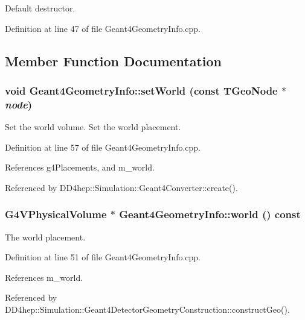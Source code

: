 Default destructor. 

Definition at line 47 of file Geant4GeometryInfo.cpp.

\subsection{Member Function Documentation}
\hypertarget{class_d_d4hep_1_1_simulation_1_1_geant4_geometry_info_a9ccd539edd7ae098b69bcb3b035b8daf}{
\subsubsection[{setWorld}]{\setlength{\rightskip}{0pt plus 5cm}void Geant4GeometryInfo::setWorld (const TGeoNode $\ast$ {\em node})}}
\label{class_d_d4hep_1_1_simulation_1_1_geant4_geometry_info_a9ccd539edd7ae098b69bcb3b035b8daf}


Set the world volume. Set the world placement. 

Definition at line 57 of file Geant4GeometryInfo.cpp.

References g4Placements, and m\_\-world.

Referenced by DD4hep::Simulation::Geant4Converter::create().\hypertarget{class_d_d4hep_1_1_simulation_1_1_geant4_geometry_info_ae30a4105631ddcfa4221f208b31b3580}{
\subsubsection[{world}]{\setlength{\rightskip}{0pt plus 5cm}G4VPhysicalVolume $\ast$ Geant4GeometryInfo::world () const}}
\label{class_d_d4hep_1_1_simulation_1_1_geant4_geometry_info_ae30a4105631ddcfa4221f208b31b3580}


The world placement. 

Definition at line 51 of file Geant4GeometryInfo.cpp.

References m\_\-world.

Referenced by DD4hep::Simulation::Geant4DetectorGeometryConstruction::constructGeo().

